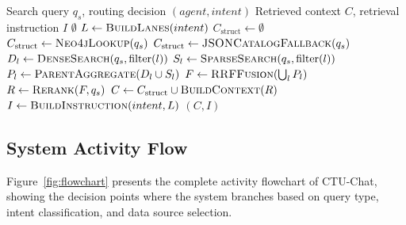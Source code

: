 \documentclass[runningheads]{llncs}
\begin{document}
\begin{algorithm}[t]
\caption{Intent-Guided Subspace Retrieval Routing (IG-SRR)}
\label{alg:igssr}
\begin{algorithmic}[1]
\Require Search query $q_s$, routing decision $(agent, intent)$
\Ensure Retrieved context $C$, retrieval instruction $I$
\Statex
{}
        \State \Return $\emptyset$ 
    \EndIf
    \State $L \gets \Call{BuildLanes}{intent}$ 
    \State $C_{\text{struct}} \gets \emptyset$
        \State $C_{\text{struct}} \gets \Call{Neo4jLookup}{q_s}$ 
            \State $C_{\text{struct}} \gets \Call{JSONCatalogFallback}{q_s}$
        \EndIf
    \EndIf
        \State $D_l \gets \Call{DenseSearch}{q_s, \text{filter}(l)}$ 
        \State $S_l \gets \Call{SparseSearch}{q_s, \text{filter}(l)}$ 
        \State $P_l \gets \Call{ParentAggregate}{D_l \cup S_l}$
    \EndFor
    \State $F \gets \Call{RRFFusion}{\bigcup_l P_l}$ 
    \State $R \gets \Call{Rerank}{F, q_s}$ 
    \State $C \gets C_{\text{struct}} \cup \Call{BuildContext}{R}$
    \State $I \gets \Call{BuildInstruction}{intent, L}$
    \State \Return $(C, I)$
\EndFunction
\end{algorithmic}
\end{algorithm}

\subsection{System Activity Flow}
\label{sec:flowchart}

Figure~\ref{fig:flowchart} presents the complete activity flowchart of CTU-Chat, showing the decision points where the system branches based on query type, intent classification, and data source selection.
\end{document}
